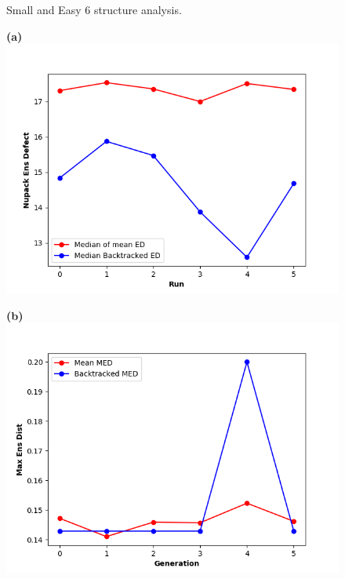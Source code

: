 \documentclass[english,12pt,a4paper]{article}
\theoremstyle{definition}
\begin{document}
\begin{figure}[H]
	\caption{Small and Easy 6 structure analysis.}\label{Fig:small_and_easy6}
	
\end{figure}

\begin{figure}[H] 
	\vspace{-0.5cm}
	\hspace{-1.2cm}
	\begin{minipage}{0.60\textwidth}
		\centering
		\textbf{(a)}\label{Fig:small1}
		\includegraphics[width=.9\linewidth]{images/data-17-ED/stat1-48}
	\end{minipage}\hfill
	\begin{minipage}{0.6\textwidth}
		\centering
		
		\textbf{(b)}\label{Fig:small2}
		\includegraphics[width=.9\linewidth]{images/data-17-ED/stat4-48}
	\end{minipage}
	

\end{figure}
\end{document}
